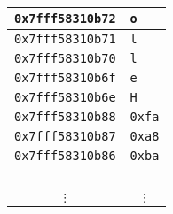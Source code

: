 \begin{tabular}{|l|l|}
\texttt{0x7fff58310b72} & \texttt{o} \\
\hline
\texttt{0x7fff58310b71} & \texttt{l} \\
\hline
\texttt{0x7fff58310b70} & \texttt{l} \\
\hline
\texttt{0x7fff58310b6f} & \texttt{e} \\
\hline
\texttt{0x7fff58310b6e} & \texttt{H} \\
\hline
\texttt{0x7fff58310b88} & \texttt{0xfa} \\
\hline
\texttt{0x7fff58310b87} & \texttt{0xa8} \\
\hline
\texttt{0x7fff58310b86} & \texttt{0xba} \\
\hline
~ & ~ \\
\multicolumn{1}{c}{$\vdots$} & \multicolumn{1}{c}{$\vdots$} \\
\end{tabular}


%

